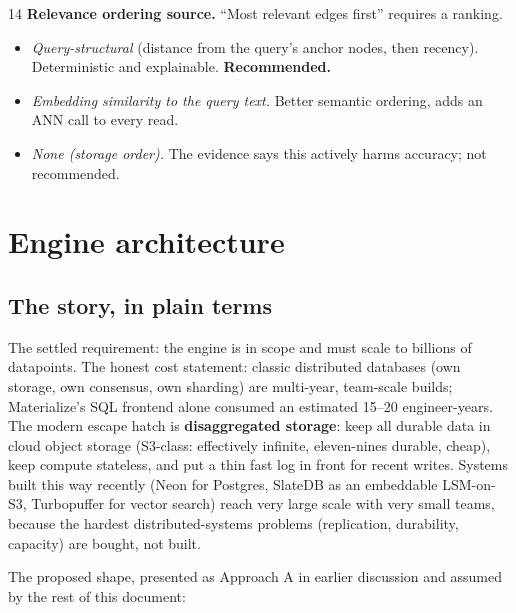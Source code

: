 \documentclass[11pt]{article}
\begin{document}
\begin{decisionbox}{14}
\textbf{Relevance ordering source.} ``Most relevant edges first'' requires a ranking.
\begin{itemize}[leftmargin=1.4em,itemsep=1pt]
  \item[A.] \emph{Query-structural} (distance from the query's anchor nodes, then recency). Deterministic and explainable. \textbf{Recommended.}
  \item[B.] \emph{Embedding similarity to the query text.} Better semantic ordering, adds an ANN call to every read.
  \item[C.] \emph{None (storage order).} The evidence says this actively harms accuracy; not recommended.
\end{itemize}
\end{decisionbox}

\section{Engine architecture}

\subsection{The story, in plain terms}

The settled requirement: the engine is in scope and must scale to billions of datapoints. The honest cost statement: classic distributed databases (own storage, own consensus, own sharding) are multi-year, team-scale builds; Materialize's SQL frontend alone consumed an estimated 15--20 engineer-years. The modern escape hatch is \textbf{disaggregated storage}: keep all durable data in cloud object storage (S3-class: effectively infinite, eleven-nines durable, cheap), keep compute stateless, and put a thin fast log in front for recent writes. Systems built this way recently (Neon for Postgres, SlateDB as an embeddable LSM-on-S3, Turbopuffer for vector search) reach very large scale with very small teams, because the hardest distributed-systems problems (replication, durability, capacity) are bought, not built.

The proposed shape, presented as Approach A in earlier discussion and assumed by the rest of this document:
\end{document}
